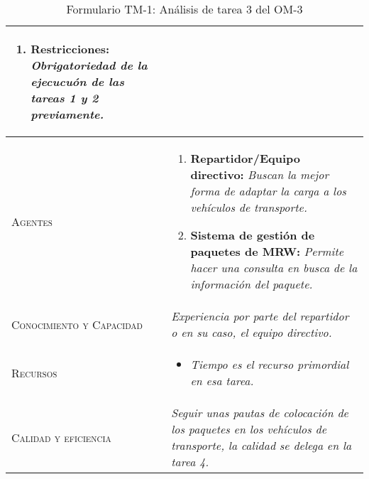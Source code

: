 \begin{table}[H]
{\begin{tabularx}{\textwidth}{|l|X|}
\begin{enumerate}
					\item \textbf{Restricciones:} \textit{Obrigatoriedad de la ejecucuón de las tareas 1 y 2 previamente.}
				\end{enumerate} \\
			\hline
			\textsc{Agentes} & 
				\begin{enumerate}
					\item \textbf{Repartidor/Equipo directivo:} \textit{Buscan la mejor forma de adaptar la carga a los vehículos de transporte.}
					\item \textbf{Sistema de gestión de paquetes de MRW:} \textit{Permite hacer una consulta en busca de la información del paquete.}
				\end{enumerate} \\
			\hline
			\textsc{Conocimiento y Capacidad} & \textit{Experiencia por parte del repartidor o en su caso, el equipo directivo.} \\
			\hline
			\textsc{Recursos} & 
				\begin{itemize}
					\item \textit{Tiempo es el recurso primordial en esa tarea.}
				\end{itemize} \\
			\hline
			\textsc{Calidad y eficiencia} & \textit{Seguir unas pautas de colocación de los paquetes en los vehículos de transporte, la calidad se delega en la tarea 4.} \\
			\hline
		\end{tabularx}
	}
	\caption{\label{tab:TM1T3}Formulario TM-1: Análisis de tarea 3 del OM-3}
\end{table} 

